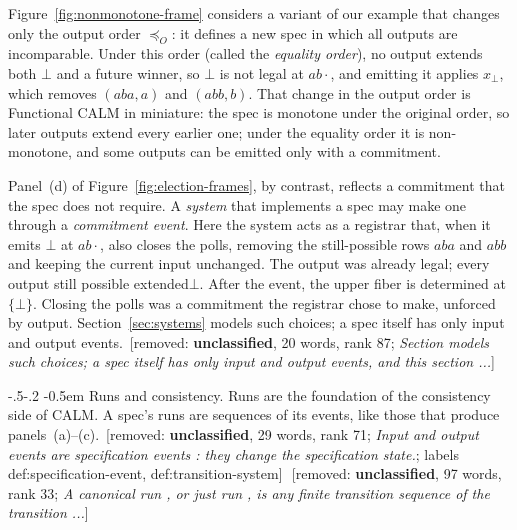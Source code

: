 \documentclass[sigconf]{cidr-2027}
\makeatletter
\theoremstyle{remark}
\renewcommand\paragraph{\@startsection{paragraph}{4}{\z@}%
  {-.5\baselineskip \@plus -2\p@ \@minus -.2\p@}%
  {-0.5em}%
  {\normalfont\bfseries}}
\newcommand{\OutputOrd}{\preceq_O}
\newcommand{\commitment}{commitment\xspace}
\newcommand{\outrel}{extends\xspace}          %
\newcommand{\outrelbase}{extend\xspace}       %
\newcommand{\outrelpast}{extended\xspace}     %
\newif\ifshowrv \showrvfalse
\newcommand{\rv}[1]{\ifshowrv\textsuperscript{\textcolor{magenta}{\textbf{R#1}}}\fi}
\newcommand{\removednote}[1]{{\color{cutred}\footnotesize\,[removed: #1]\,}}
\makeatother
\begin{document}
Figure~\ref{fig:nonmonotone-frame} considers a variant of our example that
changes only the output order $\OutputOrd$: it defines a new spec in which all outputs are incomparable. \textcolor{newblue}{Under this order (called the \emph{equality order}), no output \outrel both
$\bot$ and a future winner, so $\bot$\rv{14} is not legal at $ab\cdot$, and emitting it applies
$x_\bot$, which removes $(aba,a)$ and $(abb,b)$.} That change in the output
order is Functional CALM in miniature: the spec is monotone under the original
order, so later outputs \outrelbase every earlier one; under the equality order
it is non-monotone, and some outputs can be emitted only with a \commitment.

Panel~(d) of Figure~\ref{fig:election-frames}, by contrast, reflects a
\commitment that the spec does not require. A \emph{system} that implements a
spec may make one through a \emph{\commitment event}. Here the system acts as
a registrar that, when it emits $\bot$ at $ab\cdot$, also closes the polls,
removing the still-possible rows $aba$ and $abb$ and keeping the current input
unchanged. The output was already legal; every output still possible
\outrelpast $\bot$. After the event, the upper fiber is determined at
$\{\bot\}$. \textcolor{newblue}{Closing the polls was a \commitment the registrar chose to make, unforced by output.\rv{5}
Section~\ref{sec:systems} models such choices; a spec itself has only input and
output events.} \removednote{\textbf{unclassified}, 20 words, rank 87; \textit{Section models such choices; a spec itself has only input and output events, and this section ...}}

\paragraph{Runs and consistency.}
Runs are the foundation of the consistency side of CALM. A spec's runs are
sequences of its events, like those that produce panels~(a)--(c). \removednote{\textbf{unclassified}, 29 words, rank 71; \textit{Input and output events are specification events : they change the specification state.}; labels def:specification-event, def:transition-system} \removednote{\textbf{unclassified}, 97 words, rank 33; \textit{A canonical run , or just run , is any finite transition sequence of the transition ...}}
\end{document}
